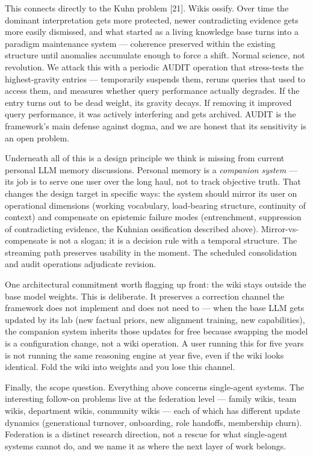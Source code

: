 \documentclass[
  11pt,
]{article}
\begin{document}
This connects directly to the Kuhn problem {[}21{]}. Wikis ossify. Over
time the dominant interpretation gets more protected, newer
contradicting evidence gets more easily dismissed, and what started as a
living knowledge base turns into a paradigm maintenance system ---
coherence preserved within the existing structure until anomalies
accumulate enough to force a shift. Normal science, not revolution. We
attack this with a periodic AUDIT operation that stress-tests the
highest-gravity entries --- temporarily suspends them, reruns queries
that used to access them, and measures whether query performance
actually degrades. If the entry turns out to be dead weight, its gravity
decays. If removing it improved query performance, it was actively
interfering and gets archived. AUDIT is the framework's main defense
against dogma, and we are honest that its sensitivity is an open
problem.

Underneath all of this is a design principle we think is missing from
current personal LLM memory discussions. Personal memory is a
\emph{companion system} --- its job is to serve one user over the long
haul, not to track objective truth. That changes the design target in
specific ways: the system should mirror its user on operational
dimensions (working vocabulary, load-bearing structure, continuity of
context) and compensate on epistemic failure modes (entrenchment,
suppression of contradicting evidence, the Kuhnian ossification
described above). Mirror-vs-compensate is not a slogan; it is a decision
rule with a temporal structure. The streaming path preserves usability
in the moment. The scheduled consolidation and audit operations
adjudicate revision.

One architectural commitment worth flagging up front: the wiki stays
outside the base model weights. This is deliberate. It preserves a
correction channel the framework does not implement and does not need to
--- when the base LLM gets updated by its lab (new factual priors, new
alignment training, new capabilities), the companion system inherits
those updates for free because swapping the model is a configuration
change, not a wiki operation. A user running this for five years is not
running the same reasoning engine at year five, even if the wiki looks
identical. Fold the wiki into weights and you lose this channel.

Finally, the scope question. Everything above concerns single-agent
systems. The interesting follow-on problems live at the federation level
--- family wikis, team wikis, department wikis, community wikis --- each
of which has different update dynamics (generational turnover,
onboarding, role handoffs, membership churn). Federation is a distinct
research direction, not a rescue for what single-agent systems cannot
do, and we name it as where the next layer of work belongs.
\end{document}
